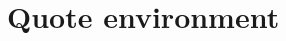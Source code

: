 \documentclass[10pt, a4paper]{article}
\begin{document}
\section{Quote environment}

\blindtext
\begin{quote}
\blindtext

\blindtext
\end{quote}

\newpage

\begin{quotation}
\blindtext

\blindtext
\end{quotation}
\blindtext
\end{document}
